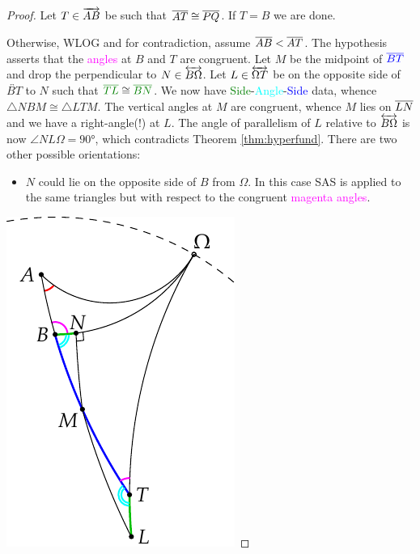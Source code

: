 \begin{proof}
	Let $T\in\overrightarrow{AB}$ be such that $\overline{AT}\cong\overline{PQ}$. If $T=B$ we are done.\par
	\begin{minipage}[t]{0.7\linewidth}\vspace{-5pt}
		Otherwise, WLOG and for contradiction, assume $\overline{AB}<\overline{AT}$. The hypothesis asserts that the \textcolor{Magenta}{angles} at $B$ and $T$ are congruent.\smallbreak
		Let $M$ be the midpoint of $\textcolor{blue}{\overline{BT}}$ and drop the perpendicular to $N\in\overleftrightarrow{B\Omega}$.\smallbreak
		Let $L\in\overleftrightarrow{\Omega T}$ be on the opposite side of $\overleftrightarrow{BT}$ to $N$ such that $\textcolor{Green}{\cl{TL}}\cong \textcolor{Green}{\cl{BN}}$.\smallbreak
		We now have \textcolor{Green}{Side}-\textcolor{cyan}{Angle}-\textcolor{blue}{Side} data, whence $\triangle NBM\cong\triangle LTM$. The vertical angles at $M$ are congruent, whence $M$ lies on $\overline{LN}$ and we have a right-angle(!) at $L$.\smallbreak
		The angle of parallelism of $L$ relative to $\overleftrightarrow{B\Omega}$ is now $\angle NL\Omega=\ang{90}$, which contradicts Theorem \ref{thm:hyperfund}.\medbreak
		There are two other possible orientations:
		\begin{itemize}\itemsep0pt
		  \item $N$ could lie on the opposite side of $B$ from $\Omega$. In this case SAS is applied to the same triangles but with respect to the congruent \textcolor{Magenta}{magenta angles}.
		\end{itemize}\vspace{-12pt}
	\end{minipage}
	\hfill
	\begin{minipage}[t]{0.29\linewidth}\vspace{-5pt}
		\flushright\includegraphics{basic-ext3}

\end{minipage}
\end{proof}

